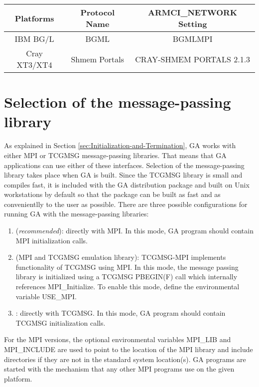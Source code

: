 \begin{tabular}{|c|c|c|}
\hline 
Platforms & Protocol Name & ARMCI\_NETWORK Setting\tabularnewline
\hline
\hline 
IBM BG/L & BGML & BGMLMPI \tabularnewline
\hline 
Cray XT3/XT4  & Shmem Portals  & CRAY-SHMEM PORTALS 2.1.3\tabularnewline
\hline
\end{tabular}


\section{Selection of the message-passing library }

As explained in Section \ref{sec:Initialization-and-Termination},
GA works with either MPI or TCGMSG message-passing libraries. That
means that GA applications can use either of these interfaces. Selection
of the message-passing library takes place when GA is built. Since
the TCGMSG library is small and compiles fast, it is included with
the GA distribution package and built on Unix workstations by default
so that the package can be built as fast and as convenientlly to the
user as possible. There are three possible configurations for running
GA with the message-passing libraries:
\begin{enumerate}
\item \textcolor{black}{} (\emph{recommended}): directly
with MPI. In this mode, GA program should contain MPI initialization
calls. 
\item \textcolor{black}{} (MPI and TCGMSG emulation
library): TCGMSG-MPI implements functionality of TCGMSG using MPI.
In this mode, the message passing library is initialized using a TCGMSG
PBEGIN(F) call which internally references MPI\_Initialize. To enable
this mode, define the environmental variable USE\_MPI. 
\item \textcolor{black}{}: directly with TCGMSG.
In this mode, GA program should contain TCGMSG initialization calls.
\end{enumerate}
For the MPI versions, the optional environmental variables MPI\_LIB
and MPI\_INCLUDE are used to point to the location of the MPI library
and include directories if they are not in the standard system location(s).
GA programs are started with the mechanism that any other MPI programs
use on the given platform.

